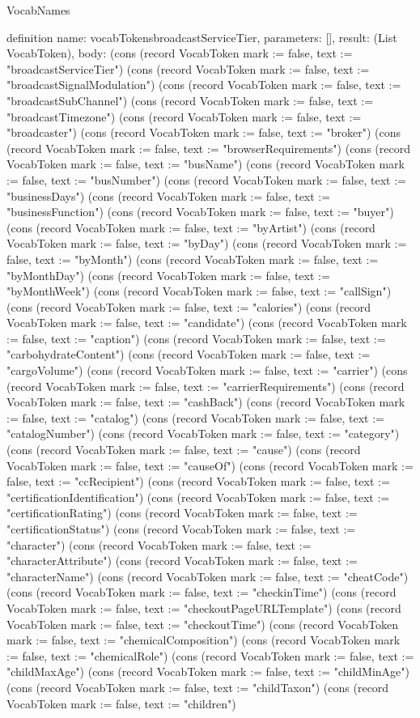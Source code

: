 \begin{lexlean}{VocabNames}
\begin{semanticmodule}
definition{
  name: vocabTokensbroadcastServiceTier,
  parameters: [],
  result: (List VocabToken),
  body: (cons (record VocabToken {mark := false, text := "broadcastServiceTier"}) (cons (record VocabToken {mark := false, text := "broadcastSignalModulation"}) (cons (record VocabToken {mark := false, text := "broadcastSubChannel"}) (cons (record VocabToken {mark := false, text := "broadcastTimezone"}) (cons (record VocabToken {mark := false, text := "broadcaster"}) (cons (record VocabToken {mark := false, text := "broker"}) (cons (record VocabToken {mark := false, text := "browserRequirements"}) (cons (record VocabToken {mark := false, text := "busName"}) (cons (record VocabToken {mark := false, text := "busNumber"}) (cons (record VocabToken {mark := false, text := "businessDays"}) (cons (record VocabToken {mark := false, text := "businessFunction"}) (cons (record VocabToken {mark := false, text := "buyer"}) (cons (record VocabToken {mark := false, text := "byArtist"}) (cons (record VocabToken {mark := false, text := "byDay"}) (cons (record VocabToken {mark := false, text := "byMonth"}) (cons (record VocabToken {mark := false, text := "byMonthDay"}) (cons (record VocabToken {mark := false, text := "byMonthWeek"}) (cons (record VocabToken {mark := false, text := "callSign"}) (cons (record VocabToken {mark := false, text := "calories"}) (cons (record VocabToken {mark := false, text := "candidate"}) (cons (record VocabToken {mark := false, text := "caption"}) (cons (record VocabToken {mark := false, text := "carbohydrateContent"}) (cons (record VocabToken {mark := false, text := "cargoVolume"}) (cons (record VocabToken {mark := false, text := "carrier"}) (cons (record VocabToken {mark := false, text := "carrierRequirements"}) (cons (record VocabToken {mark := false, text := "cashBack"}) (cons (record VocabToken {mark := false, text := "catalog"}) (cons (record VocabToken {mark := false, text := "catalogNumber"}) (cons (record VocabToken {mark := false, text := "category"}) (cons (record VocabToken {mark := false, text := "cause"}) (cons (record VocabToken {mark := false, text := "causeOf"}) (cons (record VocabToken {mark := false, text := "ccRecipient"}) (cons (record VocabToken {mark := false, text := "certificationIdentification"}) (cons (record VocabToken {mark := false, text := "certificationRating"}) (cons (record VocabToken {mark := false, text := "certificationStatus"}) (cons (record VocabToken {mark := false, text := "character"}) (cons (record VocabToken {mark := false, text := "characterAttribute"}) (cons (record VocabToken {mark := false, text := "characterName"}) (cons (record VocabToken {mark := false, text := "cheatCode"}) (cons (record VocabToken {mark := false, text := "checkinTime"}) (cons (record VocabToken {mark := false, text := "checkoutPageURLTemplate"}) (cons (record VocabToken {mark := false, text := "checkoutTime"}) (cons (record VocabToken {mark := false, text := "chemicalComposition"}) (cons (record VocabToken {mark := false, text := "chemicalRole"}) (cons (record VocabToken {mark := false, text := "childMaxAge"}) (cons (record VocabToken {mark := false, text := "childMinAge"}) (cons (record VocabToken {mark := false, text := "childTaxon"}) (cons (record VocabToken {mark := false, text := "children"}) }
\end{semanticmodule}
\end{lexlean}
